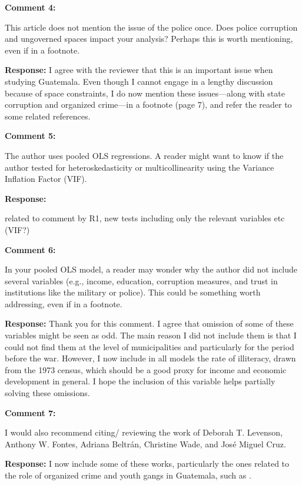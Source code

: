\documentclass[12pt, a4paper, notitlepage]{article}
\begin{document}
\vspace{15pt}
\noindent\textbf{Comment 4:}
\begin{displayquote}
This article does not mention the issue of the police once. Does police corruption and ungoverned spaces impact your analysis? Perhaps this is worth mentioning, even if in a footnote.
\end{displayquote}

\noindent\textbf{Response:} I agree with the reviewer that this is an important issue when studying Guatemala. Even though I cannot engage in a lengthy discussion because of space constraints, I do now mention these issues---along with state corruption and organized crime---in a footnote (page 7), and refer the reader to some related references.

\vspace{15pt}
\noindent\textbf{Comment 5:}
\begin{displayquote}
The author uses pooled OLS regressions. A reader might want to know if the author tested for heteroskedasticity or multicollinearity using the Variance Inflation Factor (VIF).
\end{displayquote}

\noindent\textbf{Response:} {}

related to comment by R1, new tests including only the relevant variables etc (VIF?)

\vspace{15pt}
\noindent\textbf{Comment 6:}
\begin{displayquote}
In your pooled OLS model, a reader may wonder why the author did not include several variables (e.g., income, education, corruption measures, and trust in institutions like the military or police). This could be something worth addressing, even if in a footnote.
\end{displayquote}

\noindent\textbf{Response:} Thank you for this comment. I agree that omission of some of these variables might be seen as odd. The main reason I did not include them is that I could not find them at the level of municipalities and particularly for the period before the war. However, I now include in all models the rate of illiteracy, drawn from the 1973 census, which should be a good proxy for income and economic development in general. I hope the inclusion of this variable helps partially solving these omissions.

\vspace{15pt}
\noindent\textbf{Comment 7:}
\begin{displayquote}
I would also recommend citing/ reviewing the work of Deborah T. Levenson, Anthony W. Fontes, Adriana Beltrán, Christine Wade, and José Miguel Cruz.
\end{displayquote}

\noindent\textbf{Response:} I now include some of these works, particularly the ones related to the role of organized crime and youth gangs in Guatemala, such as \citet{Peacock:2003tt, Beltran:2016td, Booth:2010wd, Levenson:2013tm}.

\newpage


\end{document}
